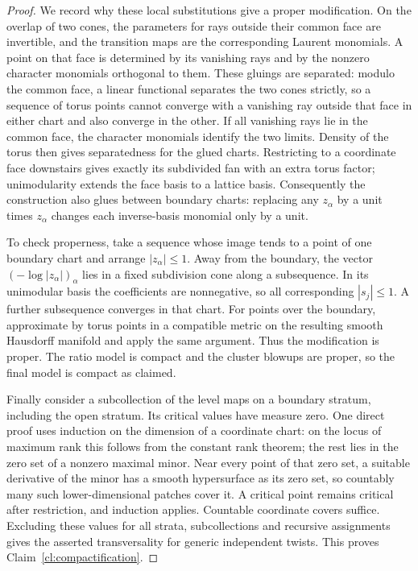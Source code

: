 \begin{proof}
We record why these local substitutions give a proper modification.
On the overlap of two cones, the parameters for rays outside their common
face are invertible, and the transition maps are the corresponding Laurent
monomials. A point on that face is determined by its vanishing rays and by
the nonzero character monomials orthogonal to them. These gluings are
separated: modulo the common face, a linear functional separates the two
cones strictly, so a sequence of torus points cannot converge with a
vanishing ray outside that face in either chart and also converge in the
other. If all vanishing rays lie in the common face, the character
monomials identify the two limits. Density of the torus then gives
separatedness for the glued charts. Restricting to a coordinate face
downstairs gives exactly its subdivided fan with an extra torus factor;
unimodularity extends the face basis to a lattice basis. Consequently the
construction also glues between boundary charts: replacing any $z_\alpha$
by a unit times $z_\alpha$ changes each inverse-basis monomial only by a
unit.

To check properness, take a sequence whose image tends to a point of one
boundary chart and arrange $|z_\alpha|\le1$. Away from the boundary,
the vector $(-\log|z_\alpha|)_\alpha$ lies in a fixed subdivision cone
along a subsequence. In its unimodular basis the coefficients are
nonnegative, so all corresponding $|s_j|\le1$. A further subsequence
converges in that chart. For points over the boundary, approximate by
torus points in a compatible metric on the resulting smooth Hausdorff
manifold and apply the same argument. Thus the modification is proper.
The ratio model is compact and the cluster blowups are proper, so the
final model is compact as claimed.

Finally consider a subcollection of the level maps on a boundary stratum,
including the open stratum. Its critical values have measure zero. One
direct proof uses induction on the dimension of a coordinate chart:
on the locus of maximum rank this follows from the constant rank theorem;
the rest lies in the zero set of a nonzero maximal minor. Near every point
of that zero set, a suitable derivative of the minor has a smooth
hypersurface as its zero set, so countably many such lower-dimensional
patches cover it. A critical point remains critical after restriction,
and induction applies. Countable coordinate covers suffice. Excluding
these values for all strata, subcollections and recursive assignments
gives the asserted transversality for generic independent twists. This
proves Claim~\ref{cl:compactification}.


\end{proof}
